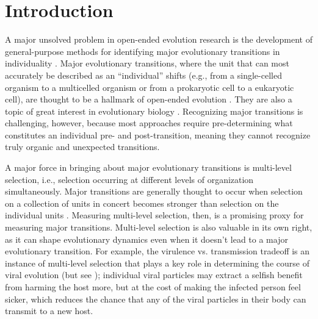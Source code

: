 \section{Introduction} \label{sec:introduction}

A major unsolved problem in open-ended evolution research is the development of general-purpose methods for identifying major evolutionary transitions in individuality \citep{dolson2019modes}. Major evolutionary transitions, where the unit that can most accurately be described as an ``individual'' shifts (e.g., from a single-celled organism to a multicelled organism or from a prokaryotic cell to a eukaryotic cell), are thought to be a hallmark of open-ended evolution \citep{taylor2016open}. They are also a topic of great interest in evolutionary biology \citep{maynardsmithMajorTransitionsEvolution1997, szathmaryMajorEvolutionaryTransitions2015}. Recognizing major transitions is challenging, however, because most approaches require pre-determining what constitutes an individual pre- and post-transition, meaning they cannot recognize truly organic and unexpected transitions.

A major force in bringing about major evolutionary transitions is multi-level selection, i.e., selection occurring at different levels of organization simultaneously. Major transitions are generally thought to occur when selection on a collection of units in concert becomes stronger than selection on the individual units \citep{michodReorganizationFitnessEvolutionary2003, ratcliffNascentLifeCycles2017}. Measuring multi-level selection, then, is a promising proxy for measuring major transitions. Multi-level selection is also valuable in its own right, as it can shape evolutionary dynamics even when it doesn't lead to a major evolutionary transition. For example, the virulence vs. transmission tradeoff is an instance of multi-level selection that plays a key role in determining the course of viral evolution \citep{coombsEvaluatingImportanceBetweenhost2007, alizonVirulenceEvolutionTradeoff2009} (but see \citep{acevedoVirulencedrivenTradeoffsDisease2019}); individual viral particles may extract a selfish benefit from harming the host more, but at the cost of making the infected person feel sicker, which reduces the chance that any of the viral particles in their body can transmit to a new host.

